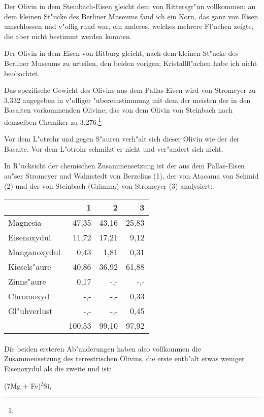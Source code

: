 \documentclass[a4paper, 11pt, oneside]{article}
\begin{document}
Der Olivin in dem Steinbach-Eisen gleicht dem von Rittersgr"un vollkommen; an dem kleinen St"ucke des Berliner Museums fand ich ein Korn, das ganz von Eisen umschlossen und v"ollig rund war, ein anderes, welches mehrere Fl"achen zeigte, die aber nicht bestimmt werden konnten.

Der Olivin in dem Eisen von Bitburg gleicht, nach dem kleinen St"ucke des Berliner Museums zu urteilen, den beiden vorigen; Kristallfl"achen habe ich nicht beobachtet.

Das spezifische Gewicht des Olivins aus dem Pallas-Eisen wird von Stromeyer zu 3,332 angegeben in v"olliger "ubereinstimmung mit dem der meisten der in den Basalten vorkommenden Olivine, das von dem Olivin von Steinbach nach demselben Chemiker zu 3,276.\footnote{}

Vor dem L"otrohr und gegen S"auren verh"alt sich dieser Olivin wie der der Basalte. Vor dem L"otrohr schmilzt er nicht und ver"andert sich nicht.

In R"ucksicht der chemischen Zusammensetzung ist der aus dem Pallas-Eisen au"ser Stromeyer und Walmstedt von Berzelius (1), der von Atacama von Schmid (2) und der von Steinbach (Grimma) von Stromeyer (3) analysiert:
\begin{center}
\begin{tabular}{ |l|r|r|r| }
    \hline
     & 1 & 2 & 3\\
    \hline\hline
    Magnesia & 47,35 & 43,16 & 25,83\\\hline
    Eisenoxydul & 11,72 & 17,21 & 9,12\\\hline
    Manganoxydul & 0,43 & 1,81 & 0,31\\\hline
    Kiesels"aure & 40,86 & 36,92 & 61,88\\\hline
    Zinns"aure & 0,17 & -,- & -,-\\\hline
    Chromoxyd & -,- & -,- & 0,33\\\hline
    Gl"uhverlust & -,- & -,- & 0,45\\\hline
     &100,53 & 99,10 & 97,92\\
    \hline
\end{tabular}
\end{center}
\paragraph{}
Die beiden ersteren Ab"anderungen haben also vollkommen die Zusammensetzung des terrestrischen Olivins, die erste enth"alt etwas weniger Eisenoxydul als die zweite und ist:
\begin{center}
(7Mg + Fe)$^{2}$Si,
\end{center}
\end{document}
